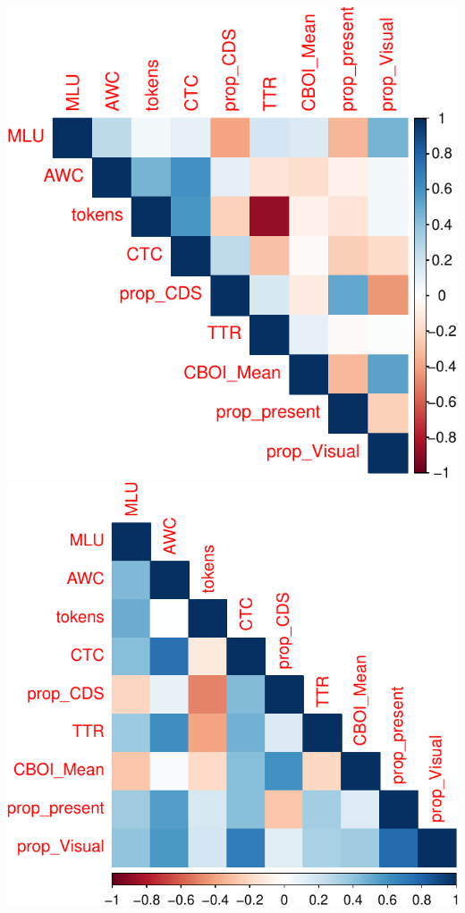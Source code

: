 \documentclass[
  man]{apa6}
\begin{document}
\includegraphics{input_quality_manuscript_files/figure-latex/variable-relationships-1.pdf} \includegraphics{input_quality_manuscript_files/figure-latex/variable-relationships-2.pdf}
\end{document}
